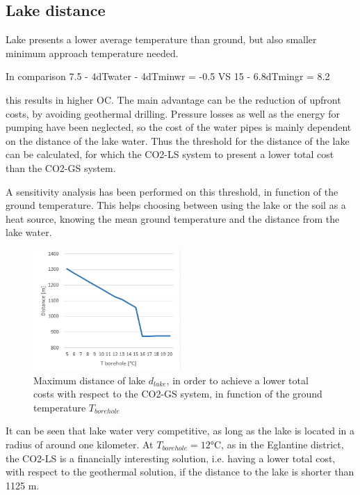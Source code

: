 \documentclass{article}
\begin{document}
\subsection{Lake distance}
Lake presents a lower average temperature than ground, but also smaller minimum approach temperature needed. 

In comparison 7.5 - 4dTwater - 4dTminwr = -0.5 VS 15 - 6.8dTmingr = 8.2

this results in higher OC. The main advantage can be the reduction of upfront costs, by avoiding geothermal drilling. Pressure losses as well as the energy for pumping have been neglected, so the cost of the water pipes is mainly dependent on the distance of the lake water. Thus the threshold for the distance of the lake can be calculated, for which the CO2-LS system to present a lower total cost than the CO2-GS system. 

A sensitivity analysis has been performed on this threshold, in function of the ground temperature. This helps choosing between using the lake or the soil as a heat source, knowing the mean ground temperature and the distance from the lake water.

\begin{figure}[htp]
	\centering
	\includegraphics[width=0.5\textwidth]{lakeDist.png}
	\caption{Maximum distance of lake $d_{lake}$, in order to achieve a lower total costs with respect to the CO2-GS system, in function of the ground temperature $T_{borehole}$}
	\label{fig:lakeDist}
\end{figure}

%

It can be seen that lake water very competitive, as long as the lake is located in a radius of around one kilometer. At $T_{borehole} = 12 \si{\celsius}$, as in the Eglantine district, the CO2-LS is a financially interesting solution, i.e. having a lower total cost, with respect to the geothermal solution, if the distance to the lake is shorter than 1125 m.
\end{document}
